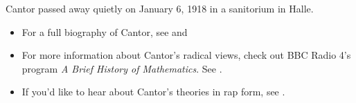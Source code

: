 \documentclass[../../../include/open-logic-section]{subfiles}
\begin{document}
Cantor passed away quietly on January 6, 1918 in a sanitorium in Halle.

\begin{reading} 
\begin{itemize} 
\item For a full biography of Cantor, see
\citet{Dauben1990} and \citet{Grattan-Guinness1971}

\item For more information about Cantor's radical views, check out BBC
Radio 4's program \emph{A Brief History of Mathematics}. See
\citet{Sautoy2014}.

\item If you'd like to hear about Cantor's theories in rap form, see
\citet{Rose2012}.

\end{itemize} 
\end{reading}
\end{document}
